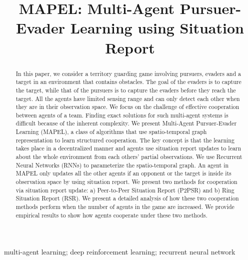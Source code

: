 \documentclass[conference]{IEEEtran}
\begin{document}
\title{MAPEL: Multi-Agent Pursuer-Evader Learning using Situation Report}

\author{
\and
{}
\and
{}
}

\maketitle

\begin{abstract}
In this paper,  we consider a territory guarding game involving pursuers, evaders and a target in an environment that contains obstacles.  The goal of the evaders is to capture the target, while that of the pursuers is to capture the evaders before they reach the target. All the agents have limited sensing range and can only detect each other when they are in their observation space. We focus on the challenge of effective cooperation between agents of a team. Finding exact solutions for such multi-agent systems is difficult because of the inherent complexity.  We present Multi-Agent Pursuer-Evader Learning (MAPEL), a class of algorithms that use spatio-temporal graph representation to learn structured cooperation. The key concept is that the learning takes place in a decentralized manner and agents use situation report updates to learn about the whole environment from each others' partial observations. We use Recurrent Neural Networks (RNNs) to parameterize the spatio-temporal graph. An agent in MAPEL only updates all the other agents if an opponent or the target is inside its observation space by using situation report. We present two methods for cooperation via situation report update: a) Peer-to-Peer Situation Report (P2PSR) and b) Ring Situation Report (RSR). We present a detailed analysis of how these two cooperation methods perform when the number of agents in the game are increased. We provide empirical results to show how agents cooperate under these two methods.
\end{abstract}

\begin{IEEEkeywords}
multi-agent learning; deep reinforcement learning; recurrent neural network
\end{IEEEkeywords}
\end{document}
